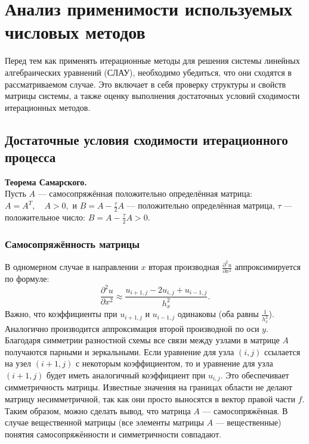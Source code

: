 \documentclass[a4paper, fleqn]{report}
\begin{document}
\chapter*{Анализ применимости используемых числовых методов}

Перед тем как применять итерационные методы для решения системы линейных алгебраических уравнений (СЛАУ), необходимо убедиться, что они сходятся в рассматриваемом случае. Это включает в себя проверку структуры и свойств матрицы системы, а также оценку выполнения достаточных условий сходимости итерационных методов.

\section*{Достаточные условия сходимости итерационного процесса}

\textbf{Теорема Самарского.} \\
Пусть $A$ — самосопряжённая положительно определённая матрица:  
$A = A^T, \quad A > 0,$  
и $B = A - \frac{\tau}{2} A$ — положительно определённая матрица, $\tau$ — положительное число:  
$B = A - \frac{\tau}{2} A > 0.$

\subsection*{Самосопряжённость матрицы}
В одномерном случае в направлении $x$ вторая производная $\frac{\partial^2 u}{\partial x^2}$ аппроксимируется по формуле:
\[
\frac{\partial^2 u}{\partial x^2} \approx \frac{u_{i+1,j} - 2u_{i,j} + u_{i-1,j}}{h_x^2}.
\]
Важно, что коэффициенты при $u_{i+1,j}$ и $u_{i-1,j}$ одинаковы (оба равны $\frac{1}{h_x^2}$).  
Аналогично производится аппроксимация второй производной по оси $y$.
Благодаря симметрии разностной схемы все связи между узлами в матрице $A$ получаются парными и зеркальными. Если уравнение для узла $(i,j)$ ссылается на узел $(i+1,j)$ с некоторым коэффициентом, то и уравнение для узла $(i+1,j)$ будет иметь аналогичный коэффициент при $u_{i,j}$. Это обеспечивает симметричность матрицы. Известные значения на границах области не делают матрицу несимметричной, так как они просто выносятся в вектор правой части $f$. Таким образом, можно сделать вывод, что матрица $A$ — самосопряжённая. В случае вещественной матрицы (все элементы матрицы $A$ — вещественные) понятия самосопряжённости и симметричности совпадают.
\end{document}
